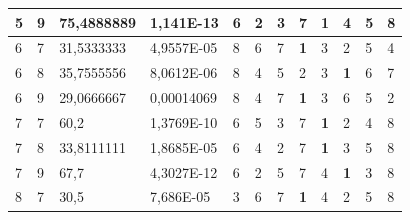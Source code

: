 \documentclass[conference]{IEEEtran}
\begin{document}
\begin{table}[]
\begin{tabular}{|llll|llllllll|}
		\multicolumn{1}{|l|}{5} & \multicolumn{1}{l|}{9} & \multicolumn{1}{l|}{75,4888889} & 1,141E-13 & \multicolumn{1}{l|}{6} & \multicolumn{1}{l|}{2} & \multicolumn{1}{l|}{3} & \multicolumn{1}{l|}{7} & \multicolumn{1}{l|}{\textbf{1}} & \multicolumn{1}{l|}{4} & \multicolumn{1}{l|}{5} & 8 \\ \hline
		\multicolumn{1}{|l|}{6} & \multicolumn{1}{l|}{7} & \multicolumn{1}{l|}{31,5333333} & 4,9557E-05 & \multicolumn{1}{l|}{8} & \multicolumn{1}{l|}{6} & \multicolumn{1}{l|}{7} & \multicolumn{1}{l|}{\textbf{1}} & \multicolumn{1}{l|}{3} & \multicolumn{1}{l|}{2} & \multicolumn{1}{l|}{5} & 4 \\ \hline
		\multicolumn{1}{|l|}{6} & \multicolumn{1}{l|}{8} & \multicolumn{1}{l|}{35,7555556} & 8,0612E-06 & \multicolumn{1}{l|}{8} & \multicolumn{1}{l|}{4} & \multicolumn{1}{l|}{5} & \multicolumn{1}{l|}{2} & \multicolumn{1}{l|}{3} & \multicolumn{1}{l|}{\textbf{1}} & \multicolumn{1}{l|}{6} & 7 \\ \hline
		\multicolumn{1}{|l|}{6} & \multicolumn{1}{l|}{9} & \multicolumn{1}{l|}{29,0666667} & 0,00014069 & \multicolumn{1}{l|}{8} & \multicolumn{1}{l|}{4} & \multicolumn{1}{l|}{7} & \multicolumn{1}{l|}{\textbf{1}} & \multicolumn{1}{l|}{3} & \multicolumn{1}{l|}{6} & \multicolumn{1}{l|}{5} & 2 \\ \hline
		\multicolumn{1}{|l|}{7} & \multicolumn{1}{l|}{7} & \multicolumn{1}{l|}{60,2} & 1,3769E-10 & \multicolumn{1}{l|}{6} & \multicolumn{1}{l|}{5} & \multicolumn{1}{l|}{3} & \multicolumn{1}{l|}{7} & \multicolumn{1}{l|}{\textbf{1}} & \multicolumn{1}{l|}{2} & \multicolumn{1}{l|}{4} & 8 \\ \hline
		\multicolumn{1}{|l|}{7} & \multicolumn{1}{l|}{8} & \multicolumn{1}{l|}{33,8111111} & 1,8685E-05 & \multicolumn{1}{l|}{6} & \multicolumn{1}{l|}{4} & \multicolumn{1}{l|}{2} & \multicolumn{1}{l|}{7} & \multicolumn{1}{l|}{\textbf{1}} & \multicolumn{1}{l|}{3} & \multicolumn{1}{l|}{5} & 8 \\ \hline
		\multicolumn{1}{|l|}{7} & \multicolumn{1}{l|}{9} & \multicolumn{1}{l|}{67,7} & 4,3027E-12 & \multicolumn{1}{l|}{6} & \multicolumn{1}{l|}{2} & \multicolumn{1}{l|}{5} & \multicolumn{1}{l|}{7} & \multicolumn{1}{l|}{4} & \multicolumn{1}{l|}{\textbf{1}} & \multicolumn{1}{l|}{3} & 8 \\ \hline
		\multicolumn{1}{|l|}{8} & \multicolumn{1}{l|}{7} & \multicolumn{1}{l|}{30,5} & 7,686E-05 & \multicolumn{1}{l|}{3} & \multicolumn{1}{l|}{6} & \multicolumn{1}{l|}{7} & \multicolumn{1}{l|}{\textbf{1}} & \multicolumn{1}{l|}{4} & \multicolumn{1}{l|}{2} & \multicolumn{1}{l|}{5} & 8 \\ \hline

\end{tabular}
\end{table}
\end{document}
